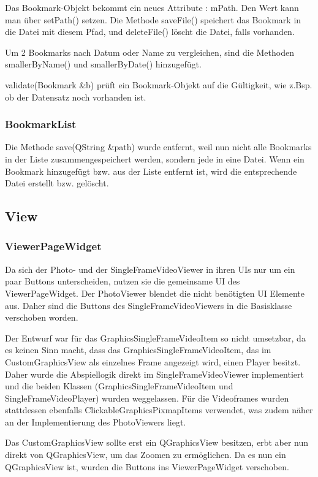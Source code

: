 Das Bookmark-Objekt bekommt ein neues Attribute : mPath. Den Wert kann man über setPath() setzen. Die Methode saveFile() speichert das Bookmark in die Datei mit diesem Pfad, und deleteFile() löscht die Datei, falls vorhanden.

Um 2 Bookmarks nach Datum oder Name zu vergleichen, sind die Methoden smallerByName() und smallerByDate() hinzugefügt.

validate(Bookmark &b) prüft ein Bookmark-Objekt auf die Gültigkeit, wie z.Bsp. ob der Datensatz noch vorhanden ist.

\subsubsection{BookmarkList}
Die Methode save(QString &path) wurde entfernt, weil nun nicht alle Bookmarks in der Liste zusammengespeichert werden, sondern jede in eine Datei. Wenn ein Bookmark hinzugefügt bzw. aus der Liste entfernt ist, wird die entsprechende Datei erstellt bzw. gelöscht.

\subsection{View}
\subsubsection{ViewerPageWidget}
Da sich der Photo- und der SingleFrameVideoViewer in ihren UIs nur um ein paar Buttons unterscheiden, nutzen sie die gemeinsame UI des ViewerPageWidget. Der PhotoViewer blendet die nicht benötigten UI Elemente aus. Daher sind die Buttons des SingleFrameVideoViewers in die Basisklasse verschoben worden.

Der Entwurf war für das GraphicsSingleFrameVideoItem so nicht umsetzbar, da es keinen Sinn macht, dass das GraphicsSingleFrameVideoItem, das im CustomGraphicsView als einzelnes Frame angezeigt wird, einen Player besitzt. Daher wurde die Abspiellogik direkt im SingleFrameVideoViewer implementiert und die beiden Klassen (GraphicsSingleFrameVideoItem und SingleFrameVideoPlayer) wurden weggelassen. Für die Videoframes wurden stattdessen ebenfalls ClickableGraphicsPixmapItems verwendet, was zudem näher an der Implementierung des PhotoViewers liegt.

Das CustomGraphicsView sollte erst ein QGraphicsView besitzen, erbt aber nun direkt von QGraphicsView, um das Zoomen zu ermöglichen. Da es nun ein QGraphicsView ist, wurden die Buttons ins ViewerPageWidget verschoben.

